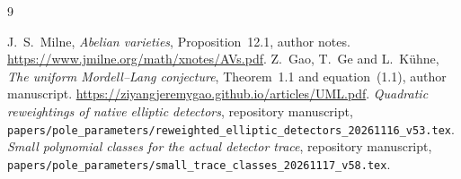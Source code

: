 \documentclass[11pt,a4paper]{article}
\begin{document}
\begin{thebibliography}{9}\raggedright
{}J.~S.~Milne, \emph{Abelian varieties},
Proposition~12.1, author notes.
\url{https://www.jmilne.org/math/xnotes/AVs.pdf}.
Z.~Gao, T.~Ge and L.~K\"uhne,
\emph{The uniform Mordell--Lang conjecture}, Theorem~1.1 and
equation~(1.1), author manuscript.
\url{https://ziyangjeremygao.github.io/articles/UML.pdf}.
\emph{Quadratic reweightings of native elliptic
detectors}, repository manuscript,
\nolinkurl{papers/pole_parameters/reweighted_elliptic_detectors_20261116_v53.tex}.
\emph{Small polynomial classes for the actual
detector trace}, repository manuscript,
\nolinkurl{papers/pole_parameters/small_trace_classes_20261117_v58.tex}.
\end{thebibliography}
\end{document}
